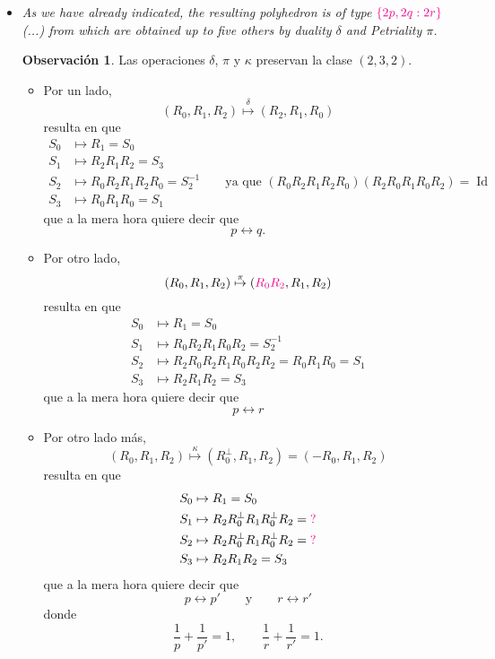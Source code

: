 \documentclass[spanish]{article}
\theoremstyle{definition}
\newtheorem*{obs}{Observación}
\DeclareMathOperator{\Id}{Id}
\begin{document}
\begin{itemize}
	\item \textit{As we have already indicated, the resulting polyhedron is of type ${\color{magenta}\{2p,2q:2r\}}$ (...) from which are obtained up to five others by duality $\delta$ and Petriality $\pi$.}

	 \begin{obs}
		Las operaciones $\delta$, $\pi$ y $\kappa$ preservan la clase $(2,3,2)$.
	\end{obs}
	\begin{itemize}
		\item Por un lado,
		\[(R_0,R_1,R_2)\overset{\delta}{\mapsto}(R_2,R_1,R_0)\]
		resulta en que
		\begin{align*}
			S_0&\mapsto R_1=S_0\\
			S_1&\mapsto R_2R_1R_2=S_3\\
			S_2&\mapsto R_0R_2R_1R_2R_0=S_2^{-1}\qquad\text{ya que }(R_0R_2R_1R_2R_0)(R_2R_0R_1R_0R_2)=\Id\\
			S_3&\mapsto R_0R_1R_0=S_1
		\end{align*}
		que a la mera hora quiere decir que
		\[p\leftrightarrow q.\]
		\item Por otro lado,
		\[(R_0,R_1,R_2)\overset{\pi}{\mapsto}({\color{magenta}R_0R_2},R_1,R_2)\]
		resulta en que
		\begin{align*}
			S_0&\mapsto R_1=S_0\\
			S_1&\mapsto R_0R_2R_1R_0R_2=S_2^{-1}\\
			S_2&\mapsto R_2R_0R_2R_1R_0R_2R_2=R_0R_1R_0=S_1\\
			S_3&\mapsto R_2R_1R_2=S_3
		\end{align*}
		que a la mera hora quiere decir que
		\[p\leftrightarrow r\]
		\item Por otro lado más,
		\[(R_0,R_1,R_2)\overset{\kappa}{\mapsto}(R_0^\perp,R_1,R_2)=(-R_0,R_1,R_2)\]
		resulta en que
		\begin{align*}
			S_0&\mapsto R_1=S_0\\
			S_1&\mapsto R_2R_0^\perp R_1R_0^\perp R_2={\color{magenta}?}\\
			S_2&\mapsto R_2R_0^\perp R_1R_0^\perp R_2={\color{magenta}?}\\
			S_3&\mapsto R_2R_1R_2=S_3
		\end{align*}
		que a la mera hora quiere decir que
		\[p\leftrightarrow p'\qquad\text{y}\qquad r\leftrightarrow r'\]
		donde
		\[\frac{1}{p}+\frac{1}{p'}=1,\qquad\frac{1}{r}+\frac{1}{r'}=1.\]
	\end{itemize}

\end{itemize}
\end{document}
